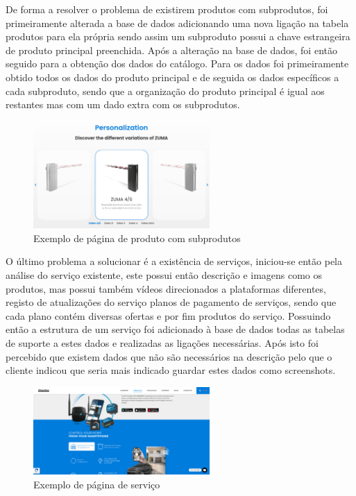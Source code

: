 De forma a resolver o problema de existirem produtos com subprodutos, foi primeiramente alterada a base de dados adicionando uma nova ligação na tabela produtos para ela própria
sendo assim um subproduto possui a chave estrangeira de produto principal preenchida. Após a alteração na base de dados, foi então seguido para a obtenção dos dados do catálogo.
Para os dados foi primeiramente obtido todos os dados do produto principal e de seguida os dados específicos a cada subproduto, sendo que a organização do produto principal é igual
aos restantes mas com um dado extra com os subprodutos. 

\begin{figure}[htb]
    \centering
    \includegraphics[width=0.6\textwidth]{images/implementacao/scraper/zuma.png}
    \caption{Exemplo de página de produto com subprodutos}
    \label{fig:61}
\end{figure}

\newpage

O último problema a solucionar é a existência de serviços, iniciou-se então pela análise do serviço existente, este possui então 
descrição e imagens como os produtos, mas possui também vídeos direcionados a plataformas diferentes, registo de atualizações do serviço
planos de pagamento de serviços, sendo que cada plano contém diversas ofertas e por fim produtos do serviço. 
Possuindo então a estrutura de um serviço foi adicionado à base de dados todas as tabelas de suporte a estes dados e realizadas as ligações necessárias.
Após isto foi percebido que existem dados que não são necessários na descrição pelo que o cliente indicou que seria mais indicado guardar estes dados
como screenshots.
\begin{figure}[htb]
    \centering
    \includegraphics[width=0.6\textwidth]{images/implementacao/scraper/mconnect.png}
    \caption{Exemplo de página de serviço}
    \label{fig:62}
\end{figure}

